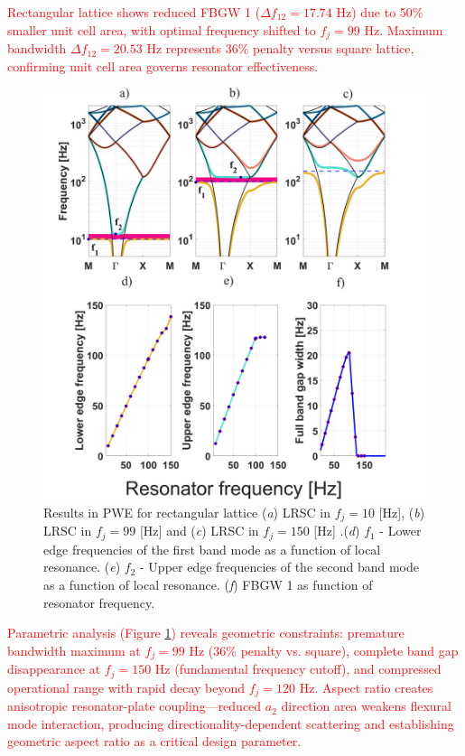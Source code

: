 \documentclass[review,numbers,sort&compress]{elsarticle}
\begin{document}
\textcolor{red}{Rectangular lattice shows reduced FBGW 1 ($\Delta f_{12} = 17.74$ Hz) due to 50\% smaller unit cell area, with optimal frequency shifted to $f_j = 99$ Hz. Maximum bandwidth $\Delta f_{12} = 20.53$ Hz represents 36\% penalty versus square lattice, confirming unit cell area governs resonator effectiveness.}
\newpage
\begin{figure}[htb]
	\centering
	\includegraphics[width=.8\textwidth]{2_2_disp_frf_rect.pdf}
	\caption{Results in PWE for rectangular lattice (\textit{a}) LRSC in $f_j=10$ [Hz], (\textit{b}) LRSC in $f_j=99$ [Hz] and (\textit{c}) LRSC in $f_j=150$ [Hz] .(\textit{d}) $f_1$ -  Lower edge frequencies of the first band mode as a function of local resonance. (\textit{e}) $f_2$ -  Upper edge frequencies of the second band mode as a function of local resonance. (\textit{f}) FBGW 1 as function of resonator frequency.}
	\label{pwe_disp_rect_all_res}
\end{figure}
\textcolor{red}{Parametric analysis (Figure \ref{pwe_disp_rect_all_res}) reveals geometric constraints: premature bandwidth maximum at $f_j = 99$ Hz (36\% penalty vs. square), complete band gap disappearance at $f_j = 150$ Hz (fundamental frequency cutoff), and compressed operational range with rapid decay beyond $f_j = 120$ Hz. Aspect ratio creates anisotropic resonator-plate coupling---reduced $a_2$ direction area weakens flexural mode interaction, producing directionality-dependent scattering and establishing geometric aspect ratio as a critical design parameter.}
\end{document}
